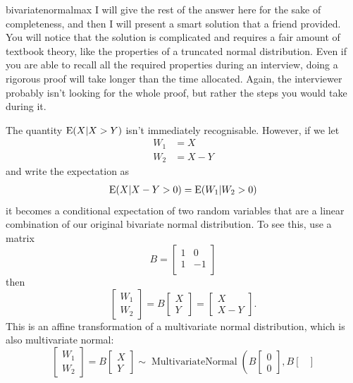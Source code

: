 \begin{answer}{bivariatenormalmax}
I will give the rest of the answer here for the sake of completeness, and then I will present a smart solution that a friend provided.
You will notice that the solution is complicated and requires a fair amount of textbook theory, like the properties of a truncated normal distribution.
Even if you are able to recall all the required properties during an interview, doing a rigorous proof will take longer than the time allocated.
Again, the interviewer probably isn't looking for the whole proof, but rather the steps you would take during it.

The quantity $\operatorname{\mathrm{E}}(X|X > Y)$ isn't immediately recognisable.
However, if we let
\begin{align*}
W_1 &= X \\
W_2 &= X-Y
\end{align*}
and write the expectation as
\begin{align*}
\operatorname{\mathrm{E}}(X|X-Y > 0) = \operatorname{\mathrm{E}}(W_1|W_2 > 0)
\end{align*}
it becomes a conditional expectation of two random variables that are a linear combination of our original bivariate normal distribution.
To see this, use a matrix
\[B =
\begin{bmatrix}
  1   &  0 \\
  1   & -1 \\
  \end{bmatrix}
\]
then
\[
\begin{bmatrix}
  W_1 \\ W_2
\end{bmatrix}
=
B
  \begin{bmatrix}
  X \\ Y
  \end{bmatrix}
  =
  \begin{bmatrix}
  X \\ X-Y
  \end{bmatrix}
  \text{.}
\]
This is an affine transformation of a multivariate normal distribution, which is also multivariate normal:
\[
\begin{bmatrix}
  W_1 \\ W_2
\end{bmatrix}
=
B
\begin{bmatrix}
X \\ Y
\end{bmatrix}
\sim
\operatorname{MultivariateNormal}
\left(
B
\begin{bmatrix}
0 \\ 0
\end{bmatrix}
  ,
  B
  \begin{bmatrix}

\end{bmatrix}\]
\end{answer}
